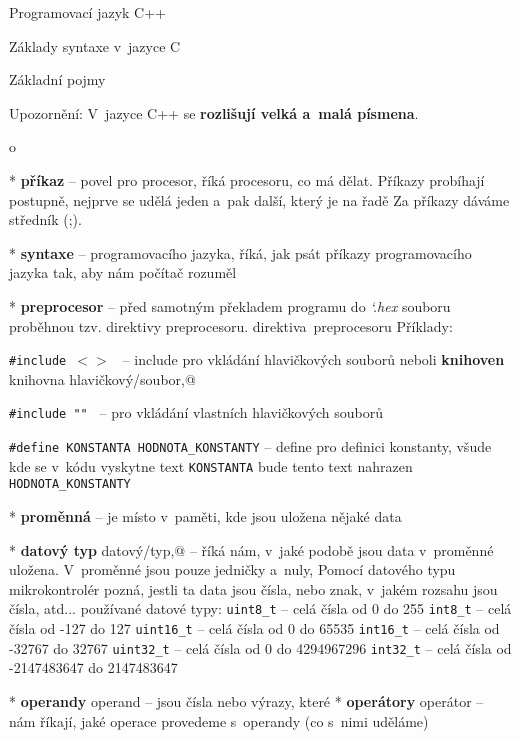 \chap Programovací jazyk C++

\sec Základy syntaxe v~jazyce C

\secc Základní pojmy

Upozornění: V~jazyce C++ se {\bf rozlišují velká a~malá písmena}.  

\begitems \style o

* {\bf příkaz}  -- povel pro procesor, říká procesoru, co má dělat.
Příkazy probíhají postupně, nejprve se udělá jeden a~pak další, který je na řadě
Za příkazy dáváme středník (;).

* {\bf syntaxe}  --  programovacího jazyka, říká, jak psát příkazy programovacího jazyka tak, aby nám počítač rozuměl 

* {\bf preprocesor}  -- před samotným překladem programu do {\it  \char`\*.hex} souboru proběhnou tzv. direktivy preprocesoru. \ii direktiva~preprocesoru \nl 
Příklady: 

 { \tt \#include $<>$ } -- \ii include pro vkládání hlavičkových souborů neboli {\bf knihoven} \ii knihovna \ii hlavičkový/soubor,@

 { \tt \#include "" } -- pro vkládání vlastních hlavičkových souborů  
 
 {\tt \#define KONSTANTA HODNOTA\_KONSTANTY} -- \ii define pro definici konstanty, všude kde se v~kódu vyskytne text {\tt KONSTANTA} bude tento text nahrazen  {\tt HODNOTA\_KONSTANTY}

* {\bf proměnná}   -- je místo v~paměti, kde jsou uložena nějaké data

* {\bf datový typ} 
 \ii datový/typ,@ -- říká nám, v~jaké podobě jsou data v~proměnné uložena. V~proměnné jsou pouze jedničky a~nuly, Pomocí datového typu mikrokontrolér pozná, jestli ta data jsou čísla, nebo znak, v~jakém rozsahu jsou čísla, atd...
používané datové typy:   \nl
{\tt uint8\_t} -- celá čísla od 0 do 255   \nl
{\tt int8\_t} -- celá čísla od -127 do 127 \nl
{\tt uint16\_t} --  celá čísla od 0 do 65535  \nl
{\tt int16\_t} -- celá čísla od -32767 do 32767 \nl
{\tt uint32\_t} -- celá čísla od 0 do 4294967296 \nl
{\tt int32\_t} -- celá čísla od -2147483647 do 2147483647 \nl

* {\bf operandy} \ii operand -- jsou čísla nebo výrazy, které  
* {\bf operátory} \ii operátor -- nám říkají, jaké operace provedeme s~operandy (co s~nimi uděláme) 


